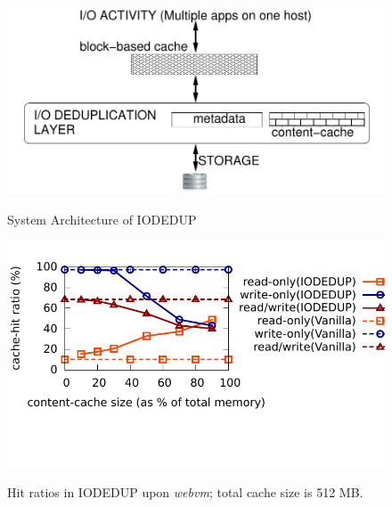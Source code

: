 \begin{figure}
	\RawFloats
	\begin{minipage}{0.45\textwidth}
	\includegraphics[scale=0.55]{confided-figures/main/sys-arch-iodedup-host.pdf}
	\vspace{-0.25in}
	\caption{System Architecture of IODEDUP}
	\label{fig:iodedup-arch}
	\end{minipage}
	\hfill
	\begin{minipage}{0.47\textwidth}
	    \includegraphics[scale=0.60]{confided-figures/sweetspot-512MB/sweetspot-512MB.pdf}
			\vspace{-0.5in}
			\caption{Hit ratios in IODEDUP upon \textit{webvm}; total cache size is 512 MB.}
			\vspace{-0.05in}
			\label{fig:sweetspot-512MB}
		\end{minipage}
\end{figure}
\vspace{-0.2in}

